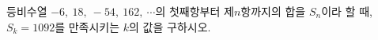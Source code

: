 등비수열 $-6,\ 18,\ -54,\ 162,\ \cdots$의 첫째항부터 제$n$항까지의 합을 $S_n$이라 할 때, $S_k=1092$를 만족시키는 $k$의 값을 구하시오.
